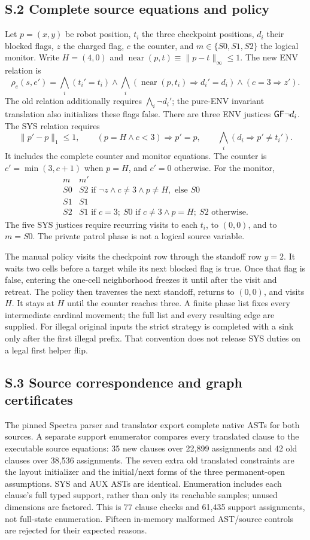 \subsection*{S.2 Complete source equations and policy}
Let $p=(x,y)$ be robot position, $t_i$ the three checkpoint positions,
$d_i$ their blocked flags, $z$ the charged flag, $c$ the counter, and
$m\in\{S0,S1,S2\}$ the logical monitor. Write $H=(4,0)$ and
$\operatorname{near}(p,t)\equiv\|p-t\|_\infty\le1$.
The new ENV relation is
\[
\rho_e(s,e')=\bigwedge_i(t_i'=t_i)\land
 \bigwedge_i(\operatorname{near}(p,t_i)\Rightarrow d_i'=d_i)
 \land(c=3\Rightarrow z').
\]
The old relation additionally requires $\bigwedge_i\neg d_i'$;
the pure-ENV invariant translation also initializes these flags false.
There are three ENV justices $\mathsf{G}\mathsf{F}\neg d_i$.
The SYS relation requires
\[
\|p'-p\|_1\le1,\qquad
(p=H\land c<3)\Rightarrow p'=p,\qquad
\bigwedge_i(d_i\Rightarrow p'\ne t_i').
\]
It includes the complete counter and monitor equations. The counter is
$c'=\min(3,c+1)$ when $p=H$, and $c'=0$ otherwise. For the monitor,
\[
\begin{array}{c|l}
m & m'\\\hline
S0 & S2\text{ if }\neg z\land c\ne3\land p\ne H,\text{ else }S0\\
S1 & S1\\
S2 & S1\text{ if }c=3;\ S0\text{ if }c\ne3\land p=H;\ S2\text{ otherwise}.
\end{array}
\]
The five SYS justices require recurring visits to each $t_i$, to $(0,0)$,
and to $m=S0$. The private patrol phase is not a logical source variable.

The manual policy visits the checkpoint row through the standoff row
$y=2$. It waits two cells before a target while its next blocked flag is
true. Once that flag is false, entering the one-cell neighborhood freezes
it until after the visit and retreat. The policy then traverses the next
standoff, returns to $(0,0)$, and visits $H$. It stays at $H$ until the
counter reaches three. A finite phase list fixes every intermediate
cardinal movement; the full list and every resulting edge are supplied.
For illegal original inputs the strict strategy is completed with a
sink only after the first illegal prefix. That convention does not
release SYS duties on a legal first helper flip.

\subsection*{S.3 Source correspondence and graph certificates}
The pinned Spectra parser and translator export complete native ASTs for
both sources. A separate support enumerator compares every translated
clause to the executable source equations: 35 new clauses over 22,899
assignments and 42 old clauses over 38,536 assignments. The seven extra
old translated constraints are the layout initializer and the initial/next
forms of the three permanent-open assumptions. SYS and AUX ASTs are
identical. Enumeration includes each clause's full typed support, rather
than only its reachable samples; unused dimensions are factored. This is
77 clause checks and 61,435 support assignments, not full-state enumeration.
Fifteen in-memory malformed AST/source controls are rejected for their
expected reasons.

